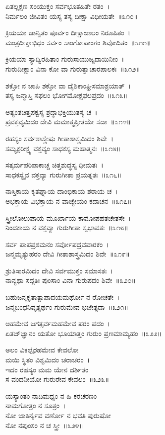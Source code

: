 ಏತಲ್ಲಕ್ಷಣ ಸಂಯುಕ್ತಂ ಸರ್ವಭೂತಹಿತೇ ರತಂ~।\\
ನಿರ್ಮಲಂ ಜೀವಿತಂ ಯಸ್ಯ ತಸ್ಯ ದೀಕ್ಷಾ ವಿಧೀಯತೇ~॥೩೧೦॥

ಕ್ರಿಯಯಾ ಚಾನ್ವಿತಂ ಪೂರ್ವಂ ದೀಕ್ಷಾಜಾಲಂ ನಿರೂಪಿತಂ~।\\
ಮಂತ್ರದೀಕ್ಷಾಭಿಧಂ ಸರ್ವಂ  ಸಾಂಗೋಪಾಂಗಂ ಶಿವೋದಿತಂ~॥೩೧೧॥

ಕ್ರಿಯಯಾ ಸ್ಯಾದ್ವಿರಹಿತಾಂ ಗುರುಸಾಯುಜ್ಯದಾಯಿನೀಂ~।\\
ಗುರುದೀಕ್ಷಾಂ ವಿನಾ ಕೋ ವಾ ಗುರುತ್ವಾಚಾರಪಾಲಕಃ~॥೩೧೨॥

ಶಕ್ತೋ ನ ಚಾಪಿ ಶಕ್ತೋ ವಾ ದೈಶಿಕಾಂಘ್ರಿಸಮಾಶ್ರಯಾತ್~।\\
ತಸ್ಯ ಜನ್ಮಾಸ್ತಿ ಸಫಲಂ ಭೋಗಮೋಕ್ಷಫಲಪ್ರದಂ~॥೩೧೩॥

ಅತ್ಯಂತಚಿತ್ತಪಕ್ವಸ್ಯ ಶ್ರದ್ಧಾಭಕ್ತಿಯುತಸ್ಯ ಚ~।\\
ಪ್ರವಕ್ತವ್ಯಮಿದಂ ದೇವಿ ಮಮಾತ್ಮಪ್ರೀತಯೇ ಸದಾ~॥೩೧೪॥

ರಹಸ್ಯಂ ಸರ್ವಶಾಸ್ತ್ರೇಷು ಗೀತಾಶಾಸ್ತ್ರಮಿದಂ ಶಿವೇ~।\\
ಸಮ್ಯಕ್ಪರೀಕ್ಷ್ಯ ವಕ್ತವ್ಯಂ ಸಾಧಕಸ್ಯ ಮಹಾತ್ಮನಃ~॥೩೧೫॥

ಸತ್ಕರ್ಮಪರಿಪಾಕಾಚ್ಚ ಚಿತ್ತಶುದ್ಧಸ್ಯ ಧೀಮತಃ~।\\
ಸಾಧಕಸ್ಯೈವ ವಕ್ತವ್ಯಾ ಗುರುಗೀತಾ ಪ್ರಯತ್ನತಃ~॥೩೧೬॥

ನಾಸ್ತಿಕಾಯ ಕೃತಘ್ನಾಯ ದಾಂಭಿಕಾಯ ಶಠಾಯ ಚ~।\\
ಅಭಕ್ತಾಯ ವಿಭಕ್ತಾಯ ನ ವಾಚ್ಯೇಯಂ ಕದಾಚನ~॥೩೧೭॥

ಸ್ತ್ರೀಲೋಲುಪಾಯ ಮೂರ್ಖಾಯ ಕಾಮೋಪಹತಚೇತಸೇ~।\\
ನಿಂದಕಾಯ ನ ವಕ್ತವ್ಯಾ ಗುರುಗೀತಾ ಸ್ವಭಾವತಃ~॥೩೧೮॥

ಸರ್ವ ಪಾಪಪ್ರಶಮನಂ ಸರ್ವೋಪದ್ರವವಾರಕಂ~।\\
ಜನ್ಮಮೃತ್ಯುಹರಂ ದೇವಿ ಗೀತಾಶಾಸ್ತ್ರಮಿದಂ ಶಿವೇ~॥೩೧೯॥

ಶ್ರುತಿಸಾರಮಿದಂ ದೇವಿ ಸರ್ವಮುಕ್ತಂ ಸಮಾಸತಃ~।\\
ನಾನ್ಯಥಾ ಸದ್ಗತಿಃ ಪುಂಸಾಂ ವಿನಾ ಗುರುಪದಂ ಶಿವೇ~॥೩೨೦॥

ಬಹುಜನ್ಮಕೃತಾತ್ಪಾಪಾದಯಮರ್ಥೋ ನ ರೋಚತೇ~।\\
ಜನ್ಮಬಂಧನಿವೃತ್ಯರ್ಥಂ ಗುರುಮೇವ ಭಜೇತ್ಸದಾ~॥೩೨೧॥

ಅಹಮೇವ ಜಗತ್ಸರ್ವಮಹಮೇವ ಪರಂ ಪದಂ~।\\
ಏತಜ್‌ಜ್ಞಾನಂ ಯತೋ ಭೂಯಾತ್ತಂ ಗುರುಂ ಪ್ರಣಮಾಮ್ಯಹಂ~॥೩೨೨॥

ಅಲಂ ವಿಕಲ್ಪೈರಹಮೇವ ಕೇವಲೋ\\ ಮಯಿ ಸ್ಥಿತಂ ವಿಶ್ವಮಿದಂ ಚರಾಚರಂ~।\\
ಇದಂ ರಹಸ್ಯಂ ಮಮ ಯೇನ ದರ್ಶಿತಂ\\ ಸ ವಂದನೀಯೋ ಗುರುರೇವ ಕೇವಲಂ~॥೩೨೩॥

ಯಸ್ಯಾಂತಂ ನಾದಿಮಧ್ಯಂ ನ ಹಿ ಕರಚರಣಂ \\ನಾಮಗೋತ್ರಂ ನ ಸೂತ್ರಂ~।\\
ನೋ ಜಾತಿರ್ನೈವ ವರ್ಣೋ ನ ಭವತಿ ಪುರುಷೋ\\ ನೋ ನಪುಂಸಂ ನ ಚ ಸ್ತ್ರೀ~॥೩೨೪॥

